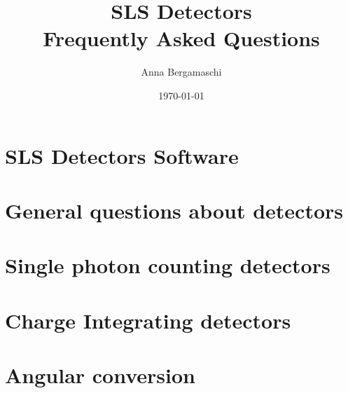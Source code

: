 \documentclass{report}
\begin{document}
\title{SLS Detectors\\ Frequently Asked Questions}
\author{Anna Bergamaschi}
\date{\today}
\maketitle
\tableofcontents
\clearpage
\chapter{SLS Detectors Software}


\chapter{General questions about detectors}



\chapter{Single photon counting detectors}


\chapter{Charge Integrating detectors}



\chapter{Angular conversion}

\end{document}
